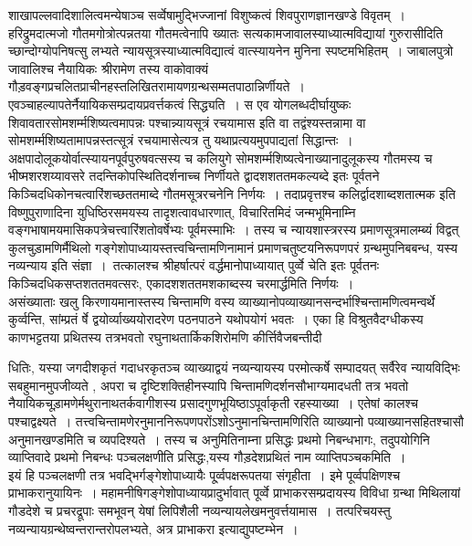 \documentclass[10pt, openany]{book}
\begin{document}
शाखापल्लवादिशालित्वमन्येषाञ्च सर्व्वेषामुद्भिज्जानां विशुष्कत्वं शिवपुराणज्ञानखण्डे विवृतम्~। हरिद्रुमदात्मजो गौतमगोत्रोत्पन्नतया गौतमत्वेनापि ख्यातः सत्यकामजावालस्याध्यात्मविद्यायां गुरुरासीदिति च्छान्दोग्योपनिषत्सु लभ्यते न्यायसूत्रस्याध्यात्मविद्यात्वं वात्स्यायनेन मुनिना स्पष्टमभिहितम्~। जाबालपुत्रो जावालिश्च नैयायिकः श्रीरामेण तस्य वाकोवाक्यं गौड़वङ्गप्रचलितप्राचीनहस्तलिखितरामायणग्रन्थसम्मतपाठान्निर्णीयते~। एवञ्चाहल्यापतेर्नैयायिकसम्प्रदायप्रवर्त्तकत्वं सिद्ध्यति~। स एव योगलब्धदीर्घायुष्कः शिवावतारसोमशर्म्मशिष्यत्वमापन्नः पश्चान्न्यायसूत्रं रचयामास इति वा तद्वंश्यस्तन्नामा वा सोमशर्म्मशिष्यतामापन्नस्तत्सूत्रं रचयामासेत्यत्र तु यथाप्रत्ययमुपपाद्यतां सिद्धान्तः~। अक्षपादोलूकयोर्वात्स्यायनपूर्वपुरुषवत्सस्य च कलियुगे सोमशर्म्मशिष्यत्वेनाख्यानादुलूकस्य गौतमस्य च भीष्मशरशय्यावसरे तदन्तिकोपस्थितिदर्शनाच्च निर्णीयते द्वादशशततमकल्यब्दे इतः पूर्वतने किञ्चिदधिकोनचत्वारिंशच्छततमाब्दे गौतमसूत्ररचनेनि निर्णयः~। तदाप्रवृत्तश्च कलिर्द्वादशाब्दशतात्मक इति विष्णुपुराणादिना युधिष्ठिरसमयस्य तादृशत्वावधारणात्, विचारितमिदं जन्मभूमिनाम्नि वङ्गभाषामयमासिकपत्रेचत्त्वारिंशतोवर्षेभ्यः पूर्वमस्माभिः~। तस्य च न्यायशास्त्ररस्य प्रमाणसूत्रमालम्ब्यं विद्वत् कुलचुड़ामणिर्मैथिलो गङ्गेशोपाध्यायस्तत्त्वचिन्तामणिनामानं प्रमाणचतुष्टयनिरूपणपरं ग्रन्थमुपनिबबन्ध, यस्य नव्यन्याय इति संज्ञा~।~तत्कालश्च {\qt श्रीहर्षात्परं} वर्द्धमानोपाध्यायात् पुर्व्वे  चेति इतः  पूर्वतनः किञ्चिदधिकसप्तशततमवत्सरः, एकादशशततमशकाब्दस्य चरमार्द्धमिति निर्णयः~।~\\

असंख्याताः खलु किरणायमानास्तस्य चिन्तामणि वस्य व्याख्यानोपव्याख्यानसन्दर्भाश्चिन्तामणित्वमन्वर्थे कुर्व्वन्ति, सांम्प्रतं र्षे द्वयोर्व्याख्ययोरादरेण पठनपाठने यथोपयोगं भवतः~। एका हि विश्रुतवैदग्धीकस्य काणभट्टतया प्रथितस्य तत्रभवतो रघुनाथतार्किकशिरोमणि कीर्त्तिवैजबन्तीदी
\newpage

\noindent धितिः, यस्या जगदीशकृतं गदाधरकृतञ्च व्याख्याद्वयं नव्यन्यायस्य परमोत्कर्षे सम्पादयत् सर्वैरेव न्यायविद्भिः सबहुमानमुपजीव्यते , अपरा च दृष्टिशक्तिहीनस्यापि चिन्तामणिदर्शनसौभाग्यमादधती तत्र भवतो नैयायिकचूड़ामणेर्मथुरानाथतर्कवागीशस्य प्रसादगुणभूयिष्ठाऽपूर्वाकृती रहस्याख्या~। एतेषां कालश्च पश्चाद्वक्ष्यते~। तत्त्वचिन्तामणेरनुमाननिरूपणपरोंऽशोऽनुमानचिन्तामणिरिति व्याख्यानो पव्याख्यानसहितश्चासौ अनुमानखण्डमिति च व्यपदिश्यते~। तस्य च अनुमितिनाम्ना प्रसिद्धः प्रथमो निबन्धभागः, तदुपयोगिनि व्याप्तिवादे प्रथमो निबन्धः पञ्चलक्षणीति प्रसिद्धः,यस्य गौड़देशप्रथितं नाम व्याप्तिपञ्चकमिति~।\\

इयं हि पञ्चलक्षणी तत्र भवद्भिर्गङ्गेशोपाध्यायैः पू्र्व्वपक्षरूपतया संगृहीता~। इमे पूर्व्वपक्षिणश्च प्राभाकरानुयायिनः~। महामनीषिगङ्गेशोपाध्यायप्रादुर्भावात् पूर्व्वे  प्राभाकरसम्प्रदायस्य विविधा ग्रन्था मिथिलायां गौडदेशे च प्रचरद्रूपाः समभूवन् येषां लिपिशैली नव्यन्यायलेखमनुवर्त्तयामास~। तत्परिचयस्तु नव्यन्यायग्रन्थेष्वन्तरान्तरोपलभ्यते, अत्र प्राभाकरा इत्याद्युपष्टम्भेन~।\\
\end{document}
